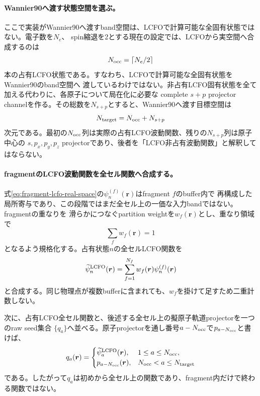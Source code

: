 \documentclass[11pt,a4paper]{article}
\begin{document}
\paragraph{Wannier90へ渡す状態空間を選ぶ。}
ここで実装がWannier90へ渡すband空間は、LCFOで計算可能な全固有状態ではない。電子数を$N_e$、
spin縮退を2とする現在の設定では、LCFOから実空間へ合成するのは
\begin{equation}
 N_{\rm occ}=\left\lceil N_e/2\right\rceil
 \label{eq:wannier-occupied-rank}
\end{equation}
本の占有LCFO状態である。すなわち、LCFOで計算可能な全固有状態をWannier90のband空間へ
渡しているわけではない。非占有LCFO固有状態を全て加える代わりに、各原子について局在化に必要な
complete $s+p$ projector channelを作る。その総数を$N_{s+p}$とすると、Wannier90へ渡す目標空間は
\begin{equation}
 N_{\rm target}=N_{\rm occ}+N_{s+p}
 \label{eq:wannier-target-rank}
\end{equation}
次元である。最初の$N_{\rm occ}$列は実際の占有LCFO波動関数、残りの$N_{s+p}$列は原子中心の
$s,p_x,p_y,p_z$ projectorであり、後者を「LCFO非占有波動関数」と解釈してはならない。

\paragraph{fragmentのLCFO波動関数を全セル関数へ合成する。}
式\eqref{eq:fragment-lcfo-real-space}の$\psi_n^{(f)}(\boldsymbol r)$はfragment $f$のbuffer内で
再構成した局所寄与であり、この段階ではまだ全セル上の一価な入力bandではない。fragmentの重なりを
滑らかにつなぐpartition weightを$w_f(\boldsymbol r)$とし、重なり領域で
\begin{equation}
 \sum_f w_f(\boldsymbol r)=1
 \label{eq:wannier-fragment-partition}
\end{equation}
となるよう規格化する。占有状態$n$の全セルLCFO関数を
\begin{equation}
 \widetilde\psi_n^{\rm LCFO}(\boldsymbol r)=\sum_{f=1}^{N_f}w_f(\boldsymbol r)\psi_n^{(f)}(\boldsymbol r)
 \label{eq:global-lcfo-composition}
\end{equation}
と合成する。同じ物理点が複数bufferに含まれても、$w_f$を掛けて足すため二重計数しない。

次に、占有LCFO全セル関数と、後述する全セル上の擬原子軌道projectorを一つのraw seed集合
$\{q_a\}$へ並べる。原子projectorを通し番号$a-N_{\rm occ}$で$p_{a-N_{\rm occ}}$と書けば、
\begin{equation}
 q_a(\boldsymbol r)=\begin{cases}
 \widetilde\psi_a^{\rm LCFO}(\boldsymbol r),&1\le a\le N_{\rm occ},\\
 p_{a-N_{\rm occ}}(\boldsymbol r),&N_{\rm occ}<a\le N_{\rm target}
 \end{cases}
 \label{eq:wannier-raw-global-seeds}
\end{equation}
である。したがって$q_a$は初めから全セル上の関数であり、fragment内だけで終わる関数ではない。
\end{document}
